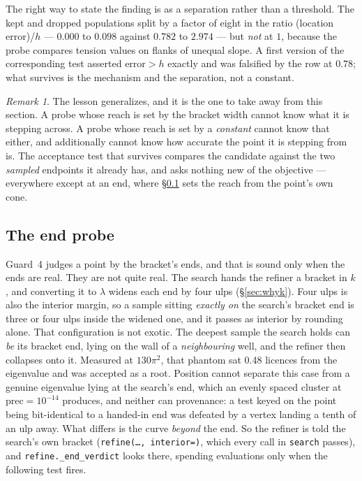 \documentclass[11pt]{article}
\theoremstyle{definition}
\theoremstyle{remark}
\newtheorem{remark}{Remark}
\newcommand{\code}[1]{\texttt{#1}}
\newcommand{\lam}{\lambda}
\newcommand{\pr}{\mathrm{prec}}
\begin{document}
The right way to state the finding is as a separation rather than a threshold. The kept and
dropped populations split by a factor of eight in the ratio (location error)/$h$ --- $0.000$ to
$0.098$ against $0.782$ to $2.974$ --- but \emph{not} at $1$, because the probe compares tension
values on flanks of unequal slope. A first version of the corresponding test asserted
$\text{error}>h$ exactly and was falsified by the row at $0.78$; what survives is the mechanism
and the separation, not a constant.

\begin{remark}
The lesson generalizes, and it is the one to take away from this section. A probe whose reach
is set by the bracket width cannot know what it is stepping across. A probe whose reach is set
by a \emph{constant} cannot know that either, and additionally cannot know how accurate the
point it is stepping from is. The acceptance test that survives compares the candidate against
the two \emph{sampled} endpoints it already has, and asks nothing new of the objective ---
everywhere except at an end, where \S\ref{sec:endprobe} sets the reach from the point's own
cone.
\end{remark}

\subsection{The end probe}
\label{sec:endprobe}

Guard~4 judges a point by the bracket's ends, and that is sound only when the ends are real.
They are not quite real. The search hands the refiner a bracket in $k$, and converting it to
$\lam$ widens each end by four ulps (\S\ref{sec:whyk}). Four ulps is also the interior margin,
so a sample sitting \emph{exactly on} the search's bracket end is three or four ulps inside
the widened one, and it passes as interior by rounding alone. That configuration is not
exotic. The deepest sample the search holds can \emph{be} its bracket end, lying on the wall of
a \emph{neighbouring} well, and the refiner then collapses onto it. Measured at $130\pi^2$, that
phantom sat 0.48 licences from the eigenvalue and was accepted as a root. Position cannot
separate this case from a genuine eigenvalue lying at the search's end, which an evenly spaced
cluster at $\pr=10^{-14}$ produces, and neither can provenance: a test keyed on the point being
bit-identical to a handed-in end was defeated by a vertex landing a tenth of an ulp away. What
differs is the curve \emph{beyond} the end. So the refiner is told the search's own bracket
(\code{refine(\dots, interior=)}, which every call in \code{search} passes), and
\code{refine.\_end\_verdict} looks there, spending evaluations only when the following test
fires.
\end{document}
